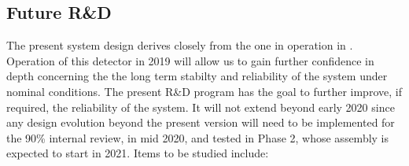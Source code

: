 \subsection{Future R\&D}
\label{sec:fdsp-hv-protodune-RD}
The present  system design derives closely from the one in operation in .  Operation of this detector in 2019 will allow us to gain further confidence in depth concerning the the long term stabilty and reliability of the  system under nominal conditions. The present R\&D program has the goal to further improve, if required, the reliability of the system. It will not extend beyond early 2020 since any design evolution beyond the present version will need to be implemented for the 90\% internal review, in mid 2020, and tested in  Phase 2, whose assembly is expected to start in 2021. Items to be studied include:
